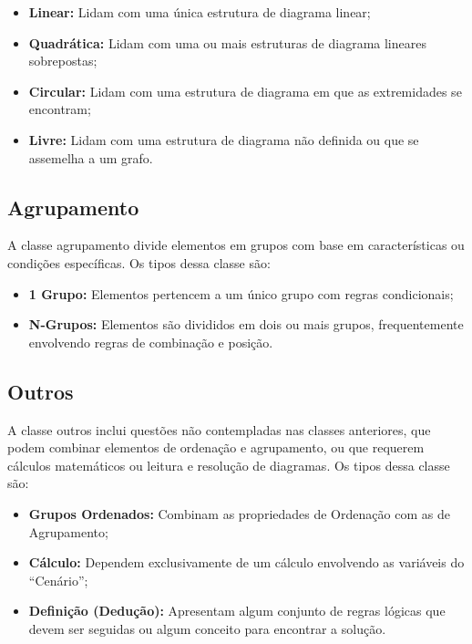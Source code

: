 \documentclass[12pt]{article}
\begin{document}
    \begin{itemize}
        \item \textbf{Linear:} Lidam com uma única estrutura de diagrama linear;
        \item \textbf{Quadrática:} Lidam com uma ou mais estruturas de diagrama lineares sobrepostas;
        \item \textbf{Circular:}  Lidam com uma estrutura de diagrama em que as extremidades se encontram;
        \item \textbf{Livre:} Lidam com uma estrutura de diagrama não definida ou que se assemelha a um grafo.
    \end{itemize}

\subsection{Agrupamento}
A classe agrupamento divide elementos em grupos com base em características ou condições específicas. Os tipos dessa classe são:

    \begin{itemize}
        \item \textbf{1 Grupo:} Elementos pertencem a um único grupo com regras condicionais;
        \item \textbf{N-Grupos:} Elementos são divididos em dois ou mais grupos, frequentemente envolvendo regras de combinação e posição.
    \end{itemize}

\subsection{Outros}
A classe outros inclui questões não contempladas nas classes anteriores, que podem combinar elementos de ordenação e agrupamento, ou que requerem cálculos matemáticos ou leitura e resolução de diagramas. Os tipos dessa classe são:

    \begin{itemize}
        \item \textbf{Grupos Ordenados:} Combinam as propriedades de Ordenação com as de Agrupamento;
        \item \textbf{Cálculo:} Dependem exclusivamente de um cálculo envolvendo as variáveis do “Cenário”;
        \item \textbf{Definição (Dedução):} Apresentam algum conjunto de regras lógicas que devem ser seguidas ou algum conceito para encontrar a solução.
    \end{itemize}
\end{document}
